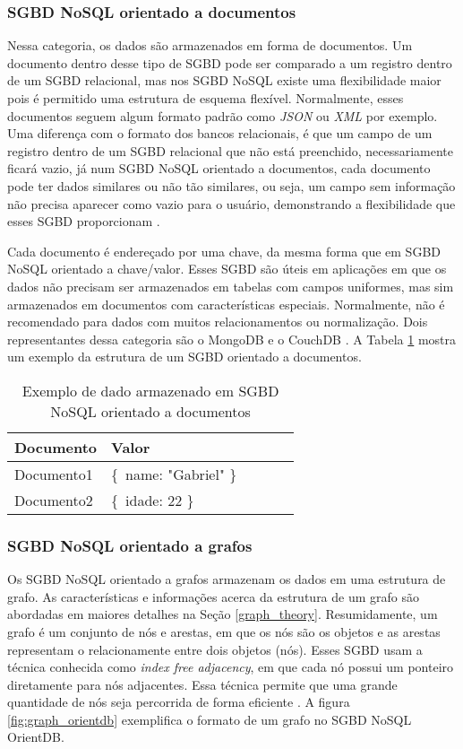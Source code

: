 \subsubsection{SGBD NoSQL orientado a documentos}
	Nessa categoria, os dados são armazenados em forma de documentos. Um documento dentro desse tipo de SGBD pode ser comparado a um registro dentro de um SGBD relacional, mas nos SGBD NoSQL existe uma flexibilidade maior pois é permitido uma estrutura de esquema flexível. Normalmente, esses documentos seguem algum formato padrão como \textit{JSON} ou \textit{XML} por exemplo. Uma diferença com o formato dos bancos relacionais, é que um campo de um registro dentro de um SGBD relacional que não está preenchido, necessariamente ficará vazio, já num SGBD NoSQL orientado a documentos, cada documento pode ter dados similares ou não tão similares, ou seja, um campo sem informação não precisa aparecer como vazio para o usuário, demonstrando a flexibilidade que esses SGBD proporcionam \cite{nayak2013type}.
	
	Cada documento é endereçado por uma chave, da mesma forma que em SGBD NoSQL orientado a chave/valor. Esses SGBD são úteis em aplicações em que os dados não precisam ser armazenados em tabelas com campos uniformes, mas sim armazenados em documentos com características especiais. Normalmente, não é recomendado para dados com muitos relacionamentos ou normalização. Dois representantes dessa categoria são o MongoDB e o CouchDB \cite{nayak2013type}. A Tabela \ref{table:documents} mostra um exemplo da estrutura de um SGBD orientado a documentos.
	
\begin{table}[h!]
\centering
\caption{Exemplo de dado armazenado em SGBD NoSQL orientado a documentos}
\begin{tabular}{|l|l|l|l|l|}
\hline
Documento & Valor \\ \hline
Documento1 & \{\ name: "Gabriel" \}\ \\ \hline
Documento2 & \{\ idade: 22 \}\ \\ \hline
\end{tabular}
\label{table:documents}
\end{table}
	
\subsubsection{SGBD NoSQL orientado a grafos}
	Os SGBD NoSQL orientado a grafos armazenam os dados em uma estrutura de grafo. As características e informações acerca da estrutura de um grafo são abordadas em maiores detalhes na Seção \ref{graph_theory}. Resumidamente, um grafo é um conjunto de nós e arestas, em que os nós são os objetos e as arestas representam o relacionamente entre dois objetos (nós). Esses SGBD usam a técnica conhecida como  \textit{index free adjacency}, em que cada nó possui um ponteiro diretamente para nós adjacentes. Essa técnica permite que uma grande quantidade de nós seja percorrida de forma eficiente \cite{nayak2013type}. A figura \ref{fig:graph_orientdb} exemplifica o formato de um grafo no SGBD NoSQL OrientDB.

